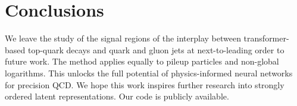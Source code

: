 \section{Conclusions}\label{sec:conclusions}

We leave the study of the signal regions of the interplay between
transformer-based top-quark decays and quark and gluon jets at
next-to-leading order to future work. The method applies equally to
pileup particles and non-global logarithms. This unlocks the full
potential of physics-informed neural networks for precision QCD. We hope
this work inspires further research into strongly ordered latent
representations. Our code is publicly available.

